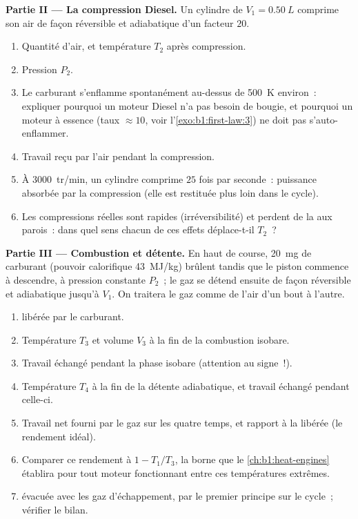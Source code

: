 \begin{problem}
\medskip
\noindent\textbf{Partie II --- La compression Diesel.}
Un cylindre de $V_1 = \qty{0.50}{L}$ comprime son air de façon réversible
et adiabatique d'un facteur $20$.
\begin{enumerate}[resume]
  \item Quantité d'air, et température $T_2$ après compression.
  \item Pression $P_2$.
  \item Le carburant s'enflamme spontanément au-dessus de \qty{500}{K}
        environ~: expliquer pourquoi un moteur Diesel n'a pas besoin de
        bougie, et pourquoi un moteur à essence (taux $\approx 10$, voir
        l'\cref{exo:b1:first-law:3}) ne doit pas s'auto-enflammer.
  \item Travail reçu par l'air pendant la compression.
  \item À \qty{3000}{tr/min}, un cylindre comprime $25$ fois par seconde~:
        puissance absorbée par la compression (elle est restituée plus loin
        dans le cycle).
  \item Les compressions réelles sont rapides (irréversibilité) et perdent
        de la  aux parois~: dans quel sens chacun de ces effets
        déplace-t-il $T_2$~?
\end{enumerate}

\medskip
\noindent\textbf{Partie III --- Combustion et détente.}
En haut de course, \qty{20}{mg} de carburant (pouvoir calorifique
\qty{43}{MJ/kg}) brûlent tandis que le piston commence à descendre, à
pression constante $P_2$~; le gaz se détend ensuite de façon réversible et
adiabatique jusqu'à $V_1$. On traitera le gaz comme de l'air d'un bout à l'autre.
\begin{enumerate}[resume]
  \item {} libérée par le carburant.
  \item Température $T_3$ et volume $V_3$ à la fin de la combustion isobare.
  \item Travail échangé pendant la phase isobare (attention au signe~!).
  \item Température $T_4$ à la fin de la détente adiabatique, et travail
        échangé pendant celle-ci.
  \item Travail net fourni par le gaz sur les quatre temps, et rapport à la
         libérée (le rendement idéal).
  \item Comparer ce rendement à $1 - T_1/T_3$, la borne que le
        \cref{ch:b1:heat-engines} établira pour tout moteur fonctionnant
        entre ces températures extrêmes.
  \item {} évacuée avec les gaz d'échappement, par le premier principe
        sur le cycle~; vérifier le bilan.
\end{enumerate}


\end{problem}
